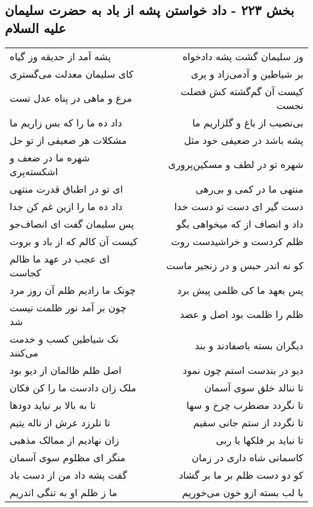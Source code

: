 \begin{center}
\section*{بخش ۲۲۳ - داد خواستن پشه از باد به حضرت سلیمان علیه السلام}
\label{sec:sh223}
\begin{longtable}{l p{0.5cm} r}
پشه آمد از حدیقه وز گیاه
&&
وز سلیمان گشت پشه دادخواه
\\
کای سلیمان معدلت می‌گستری
&&
بر شیاطین و آدمی‌زاد و پری
\\
مرغ و ماهی در پناه عدل تست
&&
کیست آن گم‌گشته کش فضلت نجست
\\
داد ده ما را که بس زاریم ما
&&
بی‌نصیب از باغ و گلزاریم ما
\\
مشکلات هر ضعیفی از تو حل
&&
پشه باشد در ضعیفی خود مثل
\\
شهره ما در ضعف و اشکسته‌پری
&&
شهره تو در لطف و مسکین‌پروری
\\
ای تو در اطباق قدرت منتهی
&&
منتهی ما در کمی و بی‌رهی
\\
داد ده ما را ازین غم کن جدا
&&
دست گیر ای دست تو دست خدا
\\
پس سلیمان گفت ای انصاف‌جو
&&
داد و انصاف از که میخواهی بگو
\\
کیست آن کالم که از باد و بروت
&&
ظلم کردست و خراشیدست روت
\\
ای عجب در عهد ما ظالم کجاست
&&
کو نه اندر حبس و در زنجیر ماست
\\
چونک ما زادیم ظلم آن روز مرد
&&
پس بعهد ما کی ظلمی پیش برد
\\
چون بر آمد نور ظلمت نیست شد
&&
ظلم را ظلمت بود اصل و عضد
\\
نک شیاطین کسب و خدمت می‌کنند
&&
دیگران بسته باصفادند و بند
\\
اصل ظلم ظالمان از دیو بود
&&
دیو در بندست استم چون نمود
\\
ملک زان دادست ما را کن فکان
&&
تا ننالد خلق سوی آسمان
\\
تا به بالا بر نیاید دودها
&&
تا نگردد مضطرب چرخ و سها
\\
تا نلرزد عرش از ناله یتیم
&&
تا نگردد از ستم جانی سقیم
\\
زان نهادیم از ممالک مذهبی
&&
تا نیاید بر فلکها یا ربی
\\
منگر ای مظلوم سوی آسمان
&&
کاسمانی شاه داری در زمان
\\
گفت پشه داد من از دست باد
&&
کو دو دست ظلم بر ما بر گشاد
\\
ما ز ظلم او به تنگی اندریم
&&
با لب بسته ازو خون می‌خوریم
\\
\end{longtable}
\end{center}
